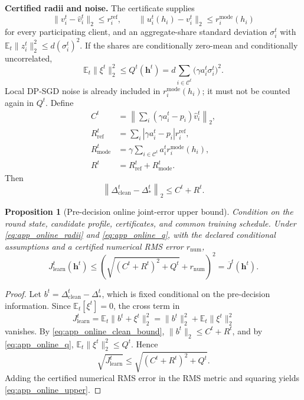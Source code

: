 \documentclass[5p,times]{elsarticle}
\theoremstyle{plain}
\newtheorem{proposition}[theorem]{Proposition}
\theoremstyle{definition}
\theoremstyle{remark}
\begin{document}
\textbf{Certified radii and noise.}
The certificate supplies
\begin{equation}
\|v_i^t-\hat v_i^t\|_2\le r_i^{\mathrm{ref}},
\qquad
\|u_i^t(h_i)-v_i^t\|_2\le r_i^{\mathrm{mode}}(h_i)
\label{eq:app_online_radii}
\end{equation}
for every participating client, and an aggregate-share standard
deviation $\sigma_i^t$ with
$\mathbb E_t\|z_i^t\|_2^2\le d(\sigma_i^t)^2$.
If the shares are conditionally zero-mean and conditionally
uncorrelated,
\begin{equation}
\mathbb E_t\|\xi^t\|_2^2
\le Q^t(\mathbf h^t)
=d\sum_{i\in\mathcal C^t}
\bigl(\gamma a_i^t\sigma_i^t\bigr)^2.
\label{eq:app_online_q}
\end{equation}
Local DP-SGD noise is already included in
$r_i^{\mathrm{mode}}(h_i)$; it must not be counted again in $Q^t$.
Define
\begin{align}
C^t&=\left\|\sum_i(\gamma a_i^t-p_i)\hat v_i^t\right\|_2,\\
R_{\mathrm{ref}}^t&=\sum_i
|\gamma a_i^t-p_i|r_i^{\mathrm{ref}},\\
R_{\mathrm{mode}}^t&=\gamma\sum_{i\in\mathcal C^t}
a_i^tr_i^{\mathrm{mode}}(h_i),\\
R^t&=R_{\mathrm{ref}}^t+R_{\mathrm{mode}}^t.
\end{align}
Then
\begin{equation}
\left\|\Delta_{\mathrm{clean}}^t-\Delta_*^t\right\|_2
\le C^t+R^t.
\label{eq:app_online_clean_bound}
\end{equation}

\begin{proposition}[Pre-decision online joint-error upper bound]
\label{prop:predecision_online_upper}
Condition on the round state, candidate profile, certificates, and
common training schedule. Under
\eqref{eq:app_online_radii} and \eqref{eq:app_online_q}, with the
declared conditional assumptions and a certified numerical RMS error
$r_{\mathrm{num}}$,
\begin{equation}
J_{\mathrm{learn}}^t(\mathbf h^t)
\le\left(
\sqrt{\left(C^t+R^t\right)^2+Q^t}
+r_{\mathrm{num}}
\right)^2
=\overline J^t(\mathbf h^t).
\label{eq:app_online_upper}
\end{equation}
\end{proposition}

\begin{proof}
Let $b^t=\Delta_{\mathrm{clean}}^t-\Delta_*^t$, which is fixed
conditional on the pre-decision information. Since
$\mathbb E_t[\xi^t]=0$, the cross term in
\begin{equation}
J_{\mathrm{learn}}^t
=\mathbb E_t\|b^t+\xi^t\|_2^2
=\|b^t\|_2^2+\mathbb E_t\|\xi^t\|_2^2
\end{equation}
vanishes. By \eqref{eq:app_online_clean_bound},
$\|b^t\|_2\le C^t+R^t$, and by \eqref{eq:app_online_q},
$\mathbb E_t\|\xi^t\|_2^2\le Q^t$. Hence
\begin{equation}
\sqrt{J_{\mathrm{learn}}^t}
\le\sqrt{\left(C^t+R^t\right)^2+Q^t}.
\end{equation}
Adding the certified numerical RMS error in the RMS metric and
squaring yields \eqref{eq:app_online_upper}.
\end{proof}
\end{document}
